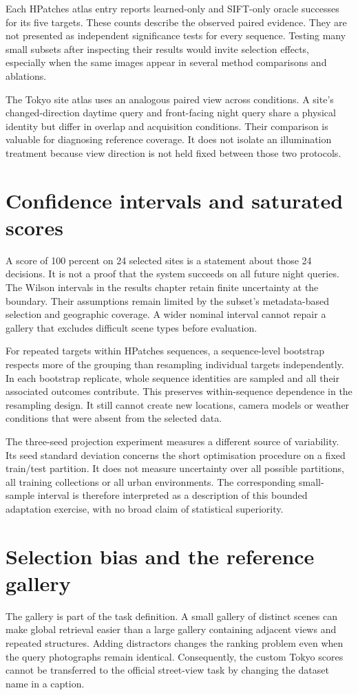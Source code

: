 Each HPatches atlas entry reports learned-only and SIFT-only oracle successes for its five targets. These counts describe the observed paired evidence. They are not presented as independent significance tests for every sequence. Testing many small subsets after inspecting their results would invite selection effects, especially when the same images appear in several method comparisons and ablations.

The Tokyo site atlas uses an analogous paired view across conditions. A site's changed-direction daytime query and front-facing night query share a physical identity but differ in overlap and acquisition conditions. Their comparison is valuable for diagnosing reference coverage. It does not isolate an illumination treatment because view direction is not held fixed between those two protocols.

\section{Confidence intervals and saturated scores}
A score of 100 percent on 24 selected sites is a statement about those 24 decisions. It is not a proof that the system succeeds on all future night queries. The Wilson intervals in the results chapter retain finite uncertainty at the boundary. Their assumptions remain limited by the subset's metadata-based selection and geographic coverage. A wider nominal interval cannot repair a gallery that excludes difficult scene types before evaluation.

For repeated targets within HPatches sequences, a sequence-level bootstrap respects more of the grouping than resampling individual targets independently. In each bootstrap replicate, whole sequence identities are sampled and all their associated outcomes contribute. This preserves within-sequence dependence in the resampling design. It still cannot create new locations, camera models or weather conditions that were absent from the selected data.

The three-seed projection experiment measures a different source of variability. Its seed standard deviation concerns the short optimisation procedure on a fixed train/test partition. It does not measure uncertainty over all possible partitions, all training collections or all urban environments. The corresponding small-sample interval is therefore interpreted as a description of this bounded adaptation exercise, with no broad claim of statistical superiority.

\section{Selection bias and the reference gallery}
The gallery is part of the task definition. A small gallery of distinct scenes can make global retrieval easier than a large gallery containing adjacent views and repeated structures. Adding distractors changes the ranking problem even when the query photographs remain identical. Consequently, the custom Tokyo scores cannot be transferred to the official street-view task by changing the dataset name in a caption.

